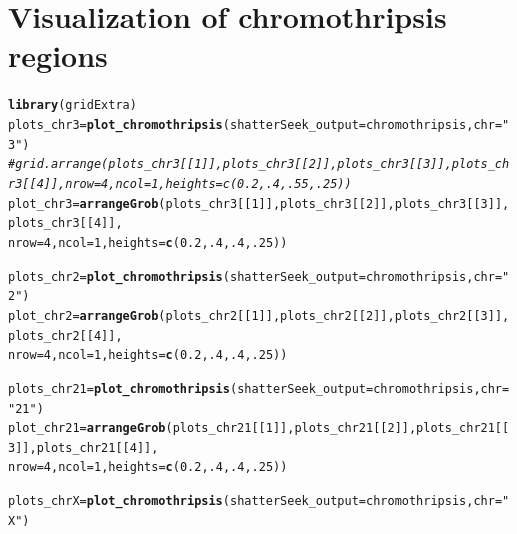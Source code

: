 \documentclass[twoside,a4wide,11pt]{article}\usepackage[]{graphicx}\usepackage[]{color}
\makeatletter
\newcommand{\hlnum}[1]{\textcolor[rgb]{0.686,0.059,0.569}{#1}}%
\newcommand{\hlstr}[1]{\textcolor[rgb]{0.192,0.494,0.8}{#1}}%
\newcommand{\hlcom}[1]{\textcolor[rgb]{0.678,0.584,0.686}{\textit{#1}}}%
\newcommand{\hlstd}[1]{\textcolor[rgb]{0.345,0.345,0.345}{#1}}%
\newcommand{\hlkwb}[1]{\textcolor[rgb]{0.69,0.353,0.396}{#1}}%
\newcommand{\hlkwc}[1]{\textcolor[rgb]{0.333,0.667,0.333}{#1}}%
\newcommand{\hlkwd}[1]{\textcolor[rgb]{0.737,0.353,0.396}{\textbf{#1}}}%
\newenvironment{kframe}{%
 \def\at@end@of@kframe{}%
 \ifinner\ifhmode%
  \def\at@end@of@kframe{\end{minipage}}%
  \begin{minipage}{\columnwidth}%
 \fi\fi%
 \def\FrameCommand##1{\hskip\@totalleftmargin \hskip-\fboxsep
 \colorbox{shadecolor}{##1}\hskip-\fboxsep
     \hskip-\linewidth \hskip-\@totalleftmargin \hskip\columnwidth}%
 \MakeFramed {\advance\hsize-\width
   \@totalleftmargin\z@ \linewidth\hsize
   \@setminipage}}%
 {\par\unskip\endMakeFramed%
 \at@end@of@kframe}
\newenvironment{knitrout}{}{} %
\makeatother
\begin{document}
\section{Visualization of chromothripsis regions}

\begin{knitrout}
\color{fgcolor}\begin{kframe}
\begin{alltt}
\hlkwd{library}\hlstd{(gridExtra)}
\hlstd{plots_chr3} \hlkwb{=} \hlkwd{plot_chromothripsis}\hlstd{(}\hlkwc{shatterSeek_output} \hlstd{= chromothripsis,}\hlkwc{chr} \hlstd{=} \hlstr{"3"}\hlstd{)}
\hlcom{#grid.arrange(plots_chr3[[1]],plots_chr3[[2]],plots_chr3[[3]],plots_chr3[[4]],nrow=4,ncol=1,heights=c(0.2,.4,.55,.25))}
\hlstd{plot_chr3} \hlkwb{=} \hlkwd{arrangeGrob}\hlstd{(plots_chr3[[}\hlnum{1}\hlstd{]],plots_chr3[[}\hlnum{2}\hlstd{]],plots_chr3[[}\hlnum{3}\hlstd{]],plots_chr3[[}\hlnum{4}\hlstd{]],}
                        \hlkwc{nrow}\hlstd{=}\hlnum{4}\hlstd{,}\hlkwc{ncol}\hlstd{=}\hlnum{1}\hlstd{,}\hlkwc{heights}\hlstd{=}\hlkwd{c}\hlstd{(}\hlnum{0.2}\hlstd{,}\hlnum{.4}\hlstd{,}\hlnum{.4}\hlstd{,}\hlnum{.25}\hlstd{))}

\hlstd{plots_chr2} \hlkwb{=} \hlkwd{plot_chromothripsis}\hlstd{(}\hlkwc{shatterSeek_output} \hlstd{= chromothripsis,}\hlkwc{chr} \hlstd{=} \hlstr{"2"}\hlstd{)}
\hlstd{plot_chr2} \hlkwb{=} \hlkwd{arrangeGrob}\hlstd{(plots_chr2[[}\hlnum{1}\hlstd{]],plots_chr2[[}\hlnum{2}\hlstd{]],plots_chr2[[}\hlnum{3}\hlstd{]],plots_chr2[[}\hlnum{4}\hlstd{]],}
                        \hlkwc{nrow}\hlstd{=}\hlnum{4}\hlstd{,}\hlkwc{ncol}\hlstd{=}\hlnum{1}\hlstd{,}\hlkwc{heights}\hlstd{=}\hlkwd{c}\hlstd{(}\hlnum{0.2}\hlstd{,}\hlnum{.4}\hlstd{,}\hlnum{.4}\hlstd{,}\hlnum{.25}\hlstd{))}

\hlstd{plots_chr21} \hlkwb{=} \hlkwd{plot_chromothripsis}\hlstd{(}\hlkwc{shatterSeek_output} \hlstd{= chromothripsis,}\hlkwc{chr} \hlstd{=} \hlstr{"21"}\hlstd{)}
\hlstd{plot_chr21} \hlkwb{=} \hlkwd{arrangeGrob}\hlstd{(plots_chr21[[}\hlnum{1}\hlstd{]],plots_chr21[[}\hlnum{2}\hlstd{]],plots_chr21[[}\hlnum{3}\hlstd{]],plots_chr21[[}\hlnum{4}\hlstd{]],}
                        \hlkwc{nrow}\hlstd{=}\hlnum{4}\hlstd{,}\hlkwc{ncol}\hlstd{=}\hlnum{1}\hlstd{,}\hlkwc{heights}\hlstd{=}\hlkwd{c}\hlstd{(}\hlnum{0.2}\hlstd{,}\hlnum{.4}\hlstd{,}\hlnum{.4}\hlstd{,}\hlnum{.25}\hlstd{))}

\hlstd{plots_chrX} \hlkwb{=} \hlkwd{plot_chromothripsis}\hlstd{(}\hlkwc{shatterSeek_output} \hlstd{= chromothripsis,}\hlkwc{chr} \hlstd{=} \hlstr{"X"}\hlstd{)}
\end{alltt}



\end{kframe}
\end{knitrout}
\end{document}
